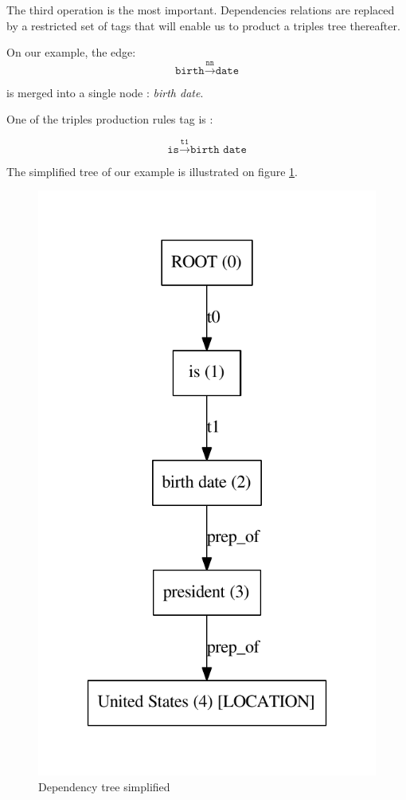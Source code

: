The third operation is the most important. Dependencies relations are replaced by a restricted set of tags that will enable us to product a triples tree thereafter.

On our example, the edge:
\[\texttt{birth}\xrightarrow{\texttt{nn}}\texttt{date}\]

is merged into a single node : \textit{birth date}.

One of the triples production rules tag is : 

\[\texttt{is}\xrightarrow{\texttt{t1}}\texttt{birth date}\]

The simplified tree of our example is illustrated on figure \ref{tree_three}.

\begin{figure}
  \centering
  \caption{Dependency tree simplified}
  \label{tree_three}
    \includegraphics[scale=0.6]{../examples_NLP_grammatical/tree3.pdf}
\end{figure}

